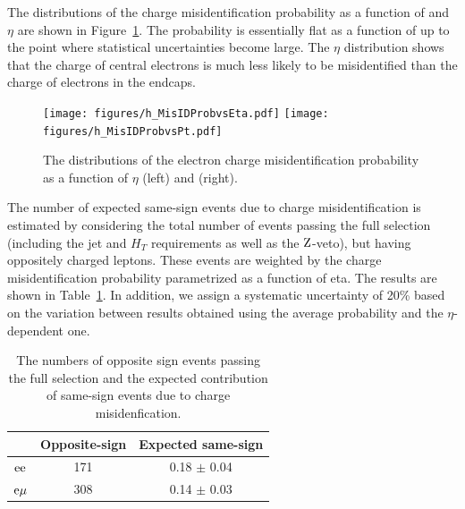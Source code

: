 The distributions of the charge misidentification probability as a function of \pt and $\eta$ are shown in Figure~\ref{fig:ChargeMisIDprob}.
The probability is essentially flat as a function of \pt up to the point where statistical uncertainties become large. The $\eta$ distribution
shows that the charge of central electrons is much less likely to be misidentified than the charge of electrons in the endcaps.

\begin{figure}[tbp]
\begin{center}
\texttt{[image: figures/h\_MisIDProbvsEta.pdf]} \hfill
\texttt{[image: figures/h\_MisIDProbvsPt.pdf]} \\ 
\caption{The distributions of the electron charge misidentification probability as a function of $\eta$ (left) and \pt (right).}
\label{fig:ChargeMisIDprob}
\end{center}
\end{figure}

The number of expected same-sign events due to charge misidentification is estimated by considering the total number of events passing the 
full selection (including the jet and $H_{T}$ requirements as well as the $\mathrm{Z}$-veto), but having oppositely charged leptons. These events are weighted by
the charge misidentification probability parametrized as a function of eta. The results are shown in Table~\ref{tab:ChargeMisIDResult}. 
In addition, we assign a systematic uncertainty of 20\% based on the variation between results obtained using the average probability and the $\eta$-dependent one. 

\begin{table}[!htbp]
    \centering
\begin{tabular}{ccc}
\hline \hline
       & Opposite-sign & Expected same-sign \\
\hline 
$\mathrm{e}\mathrm{e}$   & 171           & 0.18  $\pm$ 0.04  \\
$\mathrm{e}\mu$   & 308           & 0.14  $\pm$ 0.03  \\
\hline \hline
\end{tabular}
\caption{The numbers of opposite sign events passing the full selection and the expected contribution of same-sign events due to charge misidenfication.}
\label{tab:ChargeMisIDResult}
\end{table} 
